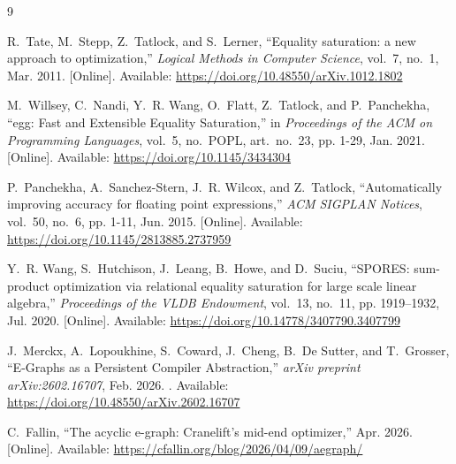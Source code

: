 \documentclass[11pt, a4paper]{article}
\begin{document}
\begin{thebibliography}{9}
    
    R.~Tate, M.~Stepp, Z.~Tatlock, and S.~Lerner,
    \newblock ``Equality saturation: a new approach to optimization,''
    \newblock \emph{Logical Methods in Computer Science}, vol.~7, no.~1, Mar. 2011. [Online]. 
    \newblock Available: \url{https://doi.org/10.48550/arXiv.1012.1802}
        
    M.~Willsey, C.~Nandi, Y.~R. Wang, O.~Flatt, Z.~Tatlock, and P.~Panchekha,
    \newblock ``egg: Fast and Extensible Equality Saturation,''
    \newblock in \emph{Proceedings of the ACM on Programming Languages}, vol.~5, no.~POPL, art.~no.~23, pp. 1-29, Jan. 2021. [Online]. 
    \newblock Available: \url{https://doi.org/10.1145/3434304}
    
    P.~Panchekha, A.~Sanchez-Stern, J.~R. Wilcox, and Z.~Tatlock,
    \newblock ``Automatically improving accuracy for floating point expressions,''
    \newblock \emph{ACM SIGPLAN Notices}, vol.~50, no.~6, pp. 1-11, Jun. 2015. [Online].
    \newblock Available: \url{https://doi.org/10.1145/2813885.2737959}

    Y.~R. Wang, S.~Hutchison, J.~Leang, B.~Howe, and D.~Suciu,
    \newblock ``SPORES: sum-product optimization via relational equality saturation for large scale linear algebra,''
    \newblock \emph{Proceedings of the VLDB Endowment}, vol.~13, no.~11, pp. 1919--1932, Jul. 2020. [Online].
    \newblock Available: \url{https://doi.org/10.14778/3407790.3407799}

    J.~Merckx, A.~Lopoukhine, S.~Coward, J.~Cheng, B.~De Sutter, and T.~Grosser,
    \newblock ``E-Graphs as a Persistent Compiler Abstraction,''
    \newblock \emph{arXiv preprint arXiv:2602.16707}, Feb. 2026.
    \newblock [Online]. Available: \url{https://doi.org/10.48550/arXiv.2602.16707}

    C.~Fallin,
    \newblock ``The acyclic e-graph: Cranelift's mid-end optimizer,''
    \newblock Apr. 2026. [Online]. Available: \url{https://cfallin.org/blog/2026/04/09/aegraph/}
    
\end{thebibliography}
\end{document}

